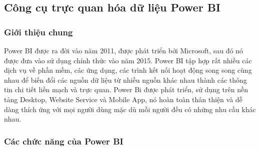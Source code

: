 \subsection{ Công cụ trực quan hóa dữ liệu Power BI}
\subsubsection{Giới thiệu chung}
Power BI được ra đời vào năm 2011, được phát triển bởi Microsoft, sau đó nó được đưa vào sử dụng chính thức vào năm 2015. Power BI tập hợp rất nhiều các dịch vụ về phần mềm, các ứng dụng, các trình kết nối hoạt động song song cùng nhau để biến đổi các nguồn dữ liệu từ nhiều nguồn khác nhau thành các thông tin chi tiết liền mạch và trực quan. Power Bi được phát triển, sử dụng trên nền tảng Desktop, Website Service và Mobile App, nó hoàn toàn thân thiện và dễ dàng thích ứng với mọi người dùng mặc dù mỗi người đều có những nhu cầu khác nhau.
\subsubsection{ Các chức năng của Power BI}

